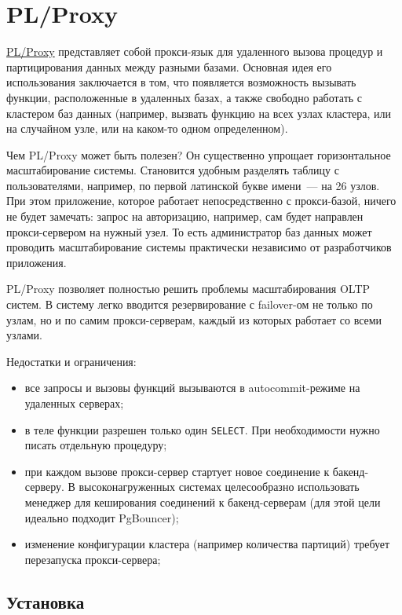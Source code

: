 \section{PL/Proxy}
\label{sec:plproxy}

\href{http://pgfoundry.org/projects/plproxy}{PL/Proxy} представляет собой прокси-язык для удаленного вызова процедур и партицирования данных между разными базами. Основная идея его использования заключается в том, что появляется возможность вызывать функции, расположенные в удаленных базах, а также свободно работать с кластером баз данных (например, вызвать функцию на всех узлах кластера, или на случайном узле, или на каком-то одном определенном).

Чем PL/Proxy может быть полезен? Он существенно упрощает горизонтальное масштабирование системы. Становится удобным разделять таблицу с пользователями, например, по первой латинской букве имени~--- на 26 узлов. При этом приложение, которое работает непосредственно с прокси-базой, ничего не будет замечать: запрос на авторизацию, например, сам будет направлен прокси-сервером на нужный узел. То есть администратор баз данных может проводить масштабирование системы практически независимо от разработчиков приложения.

PL/Proxy позволяет полностью решить проблемы масштабирования OLTP систем. В систему легко вводится резервирование с failover-ом не только по узлам, но и по самим прокси-серверам, каждый из которых работает со всеми узлами.

Недостатки и ограничения:

\begin{itemize}
  \item все запросы и вызовы функций вызываются в autocommit-режиме на удаленных серверах;
  \item в теле функции разрешен только один \lstinline!SELECT!. При необходимости нужно писать отдельную процедуру;
  \item при каждом вызове прокси-сервер стартует новое соединение к бакенд-серверу. В высоконагруженных системах целесообразно использовать менеджер для кеширования соединений к бакенд-серверам (для этой цели идеально подходит PgBouncer);
  \item изменение конфигурации кластера (например количества партиций) требует перезапуска прокси-сервера;
\end{itemize}


\subsection{Установка}


